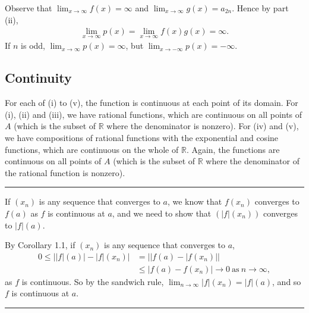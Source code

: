 \documentclass[letterpaper,10pt,english]{jupyterBook}
\begin{document}
Observe that \(\displaystyle\lim_{x \rightarrow \infty}f(x) = \infty\) and \(\displaystyle\lim_{x \rightarrow \infty}g(x) = a_{2n}\). Hence by part (ii),
\begin{equation*}
\begin{split}
\lim_{x \rightarrow \infty}p(x) = \lim_{x \rightarrow \infty}f(x)g(x) = \infty.
\end{split}
\end{equation*}
\sphinxAtStartPar
If \(n\) is odd, \(\lim_{x \rightarrow \infty}p(x) = \infty\), but \(\lim_{x \rightarrow -\infty}p(x) = -\infty\).


\subsection{Continuity}
\label{\detokenize{Solutions-full:continuity}}\label{\detokenize{Solutions-full:ch3sol}}
\sphinxAtStartPar
{\hyperref[\detokenize{Problems:id13}]{}} For each of (i) to (v), the function is continuous at each point of its domain. For (i), (ii) and (iii), we have rational functions, which are continuous on all points of \(A\) (which is the subset of \(\mathbb{R}\) where the denominator is non\sphinxhyphen{}zero). For (iv) and (v), we have compositions of rational functions with the exponential and cosine functions, which are continuous on the whole of \(\mathbb{R}\). Again, the functions are continuous on all points of \(A\) (which is the subset of \(\mathbb{R}\) where the denominator of the rational function is non\sphinxhyphen{}zero).


\bigskip\hrule\bigskip


\sphinxAtStartPar
{\hyperref[\detokenize{Problems:id14}]{}} If \((x_{n})\) is any sequence that converges to \(a\), we know that \(f(x_n)\) converges to \(f(a)\) as \(f\) is continuous at \(a\), and
we need to show that \((|f|(x_n))\) converges to \(|f|(a)\).

By Corollary 1.1, if \((x_{n})\) is any sequence that converges to \(a\),
\begin{align*}
0 \leq ||f|(a)| -|f|(x_{n})| &= ||f(a) - |f(x_{n})|| \\
&\leq |f(a) - f(x_{n})| \rightarrow 0~\mbox{as}~n \rightarrow \infty, 
\end{align*}
\sphinxAtStartPar
as \(f\) is continuous. So by the sandwich rule, \(\lim_{n\rightarrow\infty} |f|(x_{n}) = |f|(a)\), and so \(f\) is continuous at \(a\).


\bigskip\hrule\bigskip
\end{document}
